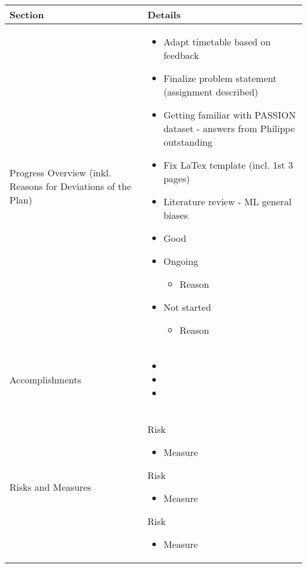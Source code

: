 \documentclass[a4paper,11pt]{article}
\newcommand{\done}{\textcolor{green}{\ding{52}}}
\newcommand{\ongoing}{\textcolor{orange}{\ding{45}}}
\newcommand{\notstarted}{\textcolor{red}{\ding{56}}}
\begin{document}
	
	\renewcommand{\arraystretch}{1.5}
	\begin{longtable}{|p{4cm}|p{10cm}|}
		\hline
		\textbf{Section} & \textbf{Details} \\
		\hline
		Progress Overview (inkl. Reasons for Deviations of the Plan) & \begin{itemize}
			\item[\done] Adapt timetable based on feedback
			\item[\ongoing] Finalize problem statement (assignment described)
			\item[\ongoing] Getting familiar with PASSION dataset - answers from Philippe outstanding
			\item[\ongoing] Fix LaTex template (incl. 1st 3 pages)
			\item[\ongoing] Literature review - ML general biases
			
			\item[\done] Good
			\item[\ongoing] Ongoing
			\begin{itemize}
				\item Reason
			\end{itemize}
			\item[\notstarted] Not started
			\begin{itemize}
				\item Reason
			\end{itemize}
		\end{itemize} \\
		\hline
		Accomplishments & \begin{itemize}
			\item[\done] 
			\item[\done] 
			\item[\done] 
		\end{itemize} \\
		\hline
		Risks and Measures & 
		Risk
		\begin{itemize}
			\item Measure
		\end{itemize}
		
	    Risk
		\begin{itemize}
			\item Measure
		\end{itemize}
		
		Risk
		\begin{itemize}
			\item Measure
		\end{itemize} \\
		

\end{longtable}
\end{document}
